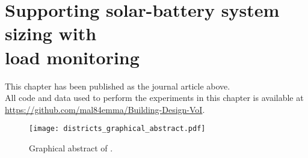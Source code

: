 
\chapter[Supporting solar-battery system sizing with load monitoring]{Supporting solar-battery system sizing with\\load monitoring} \label{chap:districts}

\graphicspath{{Districts/Figs/}}

\begin{cbox}{}

    \noindent{\color{black!50}\rule{\textwidth}{0.4mm}}\vspace{2mm}

    \noindent
    This chapter has been published as the journal article above.\\

    \noindent
    All code and data used to perform the experiments in this chapter is available at \url{https://github.com/mal84emma/Building-Design-VoI}.
\end{cbox}

\newpage

\begin{figure}
    \centering
    \texttt{[image: districts\_graphical\_abstract.pdf]}
    \caption{Graphical abstract of .}
    \label{fig:districts-district_graphical_abstract}
\end{figure}
\hfill \\

\vspace{0.5cm}

